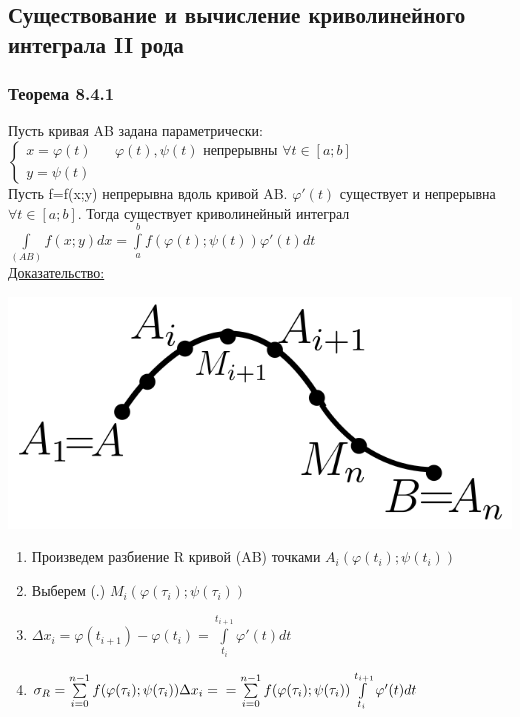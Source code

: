 \documentclass[12pt]{article}
\let\ORIincludegraphics\includegraphics
\renewcommand{\includegraphics}[2][]{\ORIincludegraphics[scale=0.65,#1]{#2}}
\let\oldint\int
\let\oldsum\sum
\renewcommand{\int}{\oldint\limits}
\renewcommand{\sum}{\oldsum\limits}
\begin{document}
  \subsection{Существование и вычисление криволинейного интеграла II рода}
  \subsubsection*{Теорема 8.4.1}\label{th:8.4.1}
  \par\noindent
  Пусть кривая AB задана параметрически:\\
  $\begin{cases}
    x=\varphi(t) \hspace{20pt} \varphi(t),\psi(t) \text{ непрерывны } \forall t \in [a;b]\\
    y=\psi(t)
  \end{cases}$\\
  Пусть f=f(x;y) непрерывна вдоль кривой AB. $\varphi'(t)$ существует и непрерывна $\forall t \in [a;b]$.
  Тогда существует криволинейный интеграл $\int_{(AB)}f(x;y)dx=\int_{a}^{b}f(\varphi(t);\psi(t))\varphi'(t)dt$\\
  \underline{Доказательство:}
  \begin{adjustwidth}{1.5em}{1.5em}
    \begin{minipage}{0.45\textwidth}
      \includegraphics[scale=0.6]{8.4.1.png}
    \end{minipage}
    \hspace{1em}
    \begin{minipage}{0.55\textwidth}
      \begin{enumerate}
        \item Произведем разбиение R кривой (AB) точками $A_i(\varphi(t_i);\psi(t_i))$
        \item Выберем (.) $M_i(\varphi(\tau_i);\psi(\tau_i))$
        \item $\Delta x_i = \varphi(t_{i+1})-\varphi(t_i)=\int_{t_i}^{t_{i+1}}\varphi'(t)dt$
        \item $\sigma_R=\sum_{i=0}^{n-1}f(\varphi(\tau_i);\psi(\tau_i))\Delta x_i=\\=\sum_{i=0}^{n-1}
        f(\varphi(\tau_i);\psi(\tau_i))\int_{t_i}^{t_{i+1}}\varphi'(t)dt$
      \end{enumerate}
    \end{minipage}
    \vspace{1em}
    \par
  \end{adjustwidth}
\end{document}

